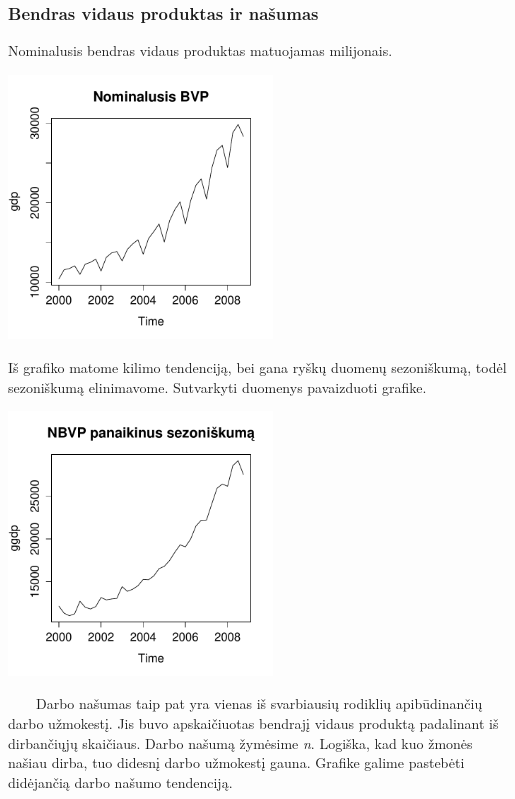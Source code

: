 \documentclass[12pt,a4paper]{article}
\theoremstyle{change}\newtheorem{salyga}{Uždavinys}
\begin{document}
\subsubsection{Bendras vidaus produktas ir našumas}

\hspace{40pt}Nominalusis bendras vidaus produktas matuojamas milijonais. 
\vskip 8pt
\begin{center}
\includegraphics[width=70mm,height=70mm]{ngdp}
\end{center}
Iš grafiko matome kilimo tendenciją, bei gana ryškų duomenų sezoniškumą, todėl sezoniškumą elinimavome. Sutvarkyti duomenys pavaizduoti grafike. 
\vskip 8pt
\begin{center}
\includegraphics[width=70mm,height=70mm]{gngdp}
\end{center}
\vskip 8pt
$\qquad$Darbo našumas taip pat yra vienas iš svarbiausių rodiklių apibūdinančių darbo užmokestį. Jis buvo apskaičiuotas  bendrajį vidaus produktą padalinant iš dirbančiųjų skaičiaus. Darbo našumą žymėsime \textit{n}. Logiška, kad kuo žmonės našiau dirba, tuo didesnį darbo užmokestį gauna. Grafike galime pastebėti didėjančią darbo našumo tendenciją. 
\end{document}
